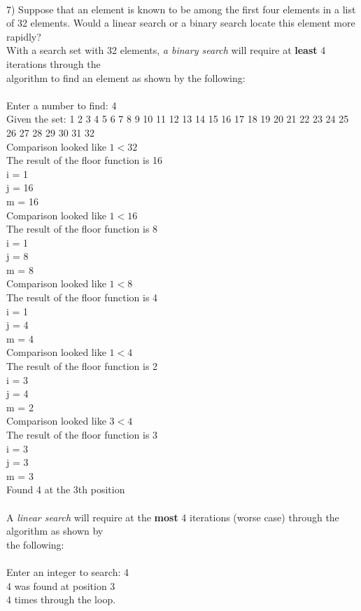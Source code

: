 \documentclass{article}
\begin{document}
\begin{flushleft}
~\\
\setlength\parindent{0pt}7) Suppose that an element is known to be among the first four elements in a list of 32 elements.  Would a linear search or a binary search locate this element more rapidly?
\\
\setlength\parindent{24pt}With a search set with 32 elements, \textit{a binary search} will require at \textbf{least} 4 iterations through the \\algorithm to find an element as shown by the following:
\\
~\\
Enter a number to find: 4\\
Given the set: 1 2 3 4 5 6 7 8 9 10 11 12 13 14 15 16 17 18 19 20 21 22 23 24 25 26 27 28 29 30 31 32 \\
Comparison looked like $1 < 32$ \\
The result of the floor function is 16 \\
i = 1\\
j = 16\\
m = 16\\
Comparison looked like $1 < 16$\\
The result of the floor function is 8 \\
i = 1 \\
j = 8 \\
m = 8 \\
Comparison looked like $1 < 8$ \\
The result of the floor function is 4 \\
i = 1 \\
j = 4 \\
m = 4 \\
Comparison looked like $1 < 4 $\\
The result of the floor function is 2 \\
i = 3 \\
j = 4 \\
m = 2 \\
Comparison looked like $3 < 4$ \\
The result of the floor function is 3 \\
i = 3 \\
j = 3 \\
m = 3 \\
Found 4 at the 3th position \\
~\\
A \textit{linear search} will require at the \textbf{most} 4 iterations (worse case) through the algorithm as shown by \\the following:\\
~\\
Enter an integer to search: 4\\
4 was found at position 3\\
4 times through the loop.\\


\end{flushleft}
\end{document}
